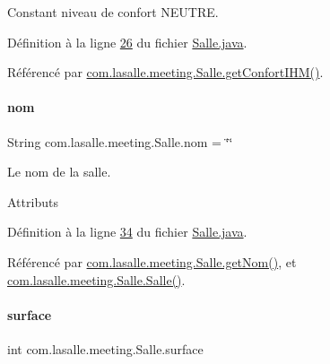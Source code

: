 Constant niveau de confort N\+E\+U\+T\+RE. 



Définition à la ligne \hyperlink{_salle_8java_source_l00026}{26} du fichier \hyperlink{_salle_8java_source}{Salle.\+java}.



Référencé par \hyperlink{_salle_8java_source_l00233}{com.\+lasalle.\+meeting.\+Salle.\+get\+Confort\+I\+H\+M()}.

\mbox{\label{classcom_1_1lasalle_1_1meeting_1_1_salle_a3641e82a9fa78c5dc8bd9a5b92bae482}} 
\paragraph{\texorpdfstring{nom}{nom}}
{\footnotesize\ttfamily String com.\+lasalle.\+meeting.\+Salle.\+nom = \char`\"{}\char`\"{}\hspace{0.3cm}{\ttfamily [private]}}



Le nom de la salle. 

Attributs 

Définition à la ligne \hyperlink{_salle_8java_source_l00034}{34} du fichier \hyperlink{_salle_8java_source}{Salle.\+java}.



Référencé par \hyperlink{_salle_8java_source_l00165}{com.\+lasalle.\+meeting.\+Salle.\+get\+Nom()}, et \hyperlink{_salle_8java_source_l00054}{com.\+lasalle.\+meeting.\+Salle.\+Salle()}.

\mbox{\label{classcom_1_1lasalle_1_1meeting_1_1_salle_a1b761514679fa5f98e71809fea448384}} 
\paragraph{\texorpdfstring{surface}{surface}}
{\footnotesize\ttfamily int com.\+lasalle.\+meeting.\+Salle.\+surface\hspace{0.3cm}{\ttfamily [private]}}



